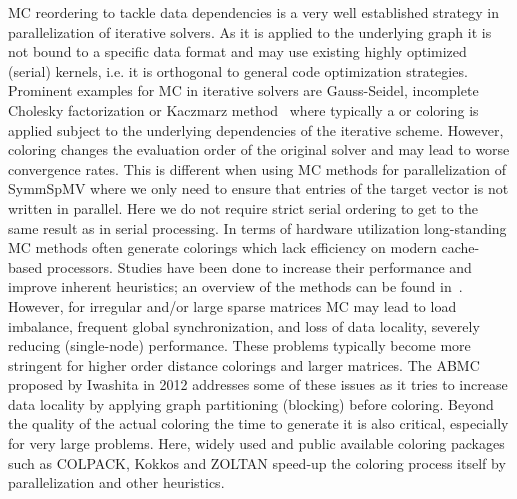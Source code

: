 
\Acrfull{MC} reordering to tackle data dependencies is a very well established strategy in parallelization of iterative solvers. As it is applied to the underlying graph it is not bound to a specific data format and may use existing highly optimized (serial) kernels, i.e. it is orthogonal to general code optimization strategies.  
Prominent examples for  \acrshort{MC} in iterative solvers are Gauss-Seidel, incomplete 
Cholesky factorization or Kaczmarz method~\cite{RBGS,MC,feast_mc} where typically a \DONE or \DTWO coloring is applied subject to the underlying dependencies of the iterative scheme. However, coloring changes the evaluation order of the original solver and may lead to worse convergence rates. This is different when using  \acrshort{MC} methods for parallelization of \acrshort{SymmSpMV} where we only need to ensure that entries of the target vector is not written in parallel. Here we do not  require strict serial ordering to get to the same result as in serial processing.
In terms of hardware utilization long-standing \acrshort{MC} methods often generate colorings which lack efficiency on modern cache-based
processors. Studies have been done to increase their
performance and improve inherent heuristics; an overview of the methods can be found in~\cite{gebremedhin2000scalable,dist_k_def,COLPACK,equitable_color}. However, 
for irregular and/or large sparse 
matrices \acrshort{MC} may lead to load imbalance, frequent global synchronization, 
and loss of data locality, severely reducing (single-node) performance. 
These problems typically become more stringent for higher order distance
colorings and larger matrices.
The \acrfull{ABMC}~\cite{ABMC} proposed by Iwashita \etal in 2012 addresses some of these issues as it tries to increase data locality by applying graph partitioning (blocking) before coloring. 
Beyond the quality of the actual coloring the time to generate it is also critical, especially for very large problems. Here, widely used and public available coloring packages such as COLPACK\cite{COLPACK}, Kokkos\cite{kokkos} and ZOLTAN\cite{BOZDAG2008515,doi:10.1137/080732158} speed-up the coloring process itself by parallelization and other heuristics. 

